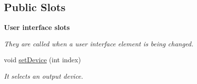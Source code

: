 \subsection*{Public Slots}
\begin{Indent}\textbf{ User interface slots}\par
{\em They are called when a user interface element is being changed. }\begin{DoxyCompactItemize}
\item 
void \hyperlink{class_audio_output_a1bfc3c2ca0fa53a8e2962ef784014317}{set\+Device} (int index)
\begin{DoxyCompactList}\small\item\em It selects an output device. \end{DoxyCompactList}\end{DoxyCompactItemize}
\end{Indent}
